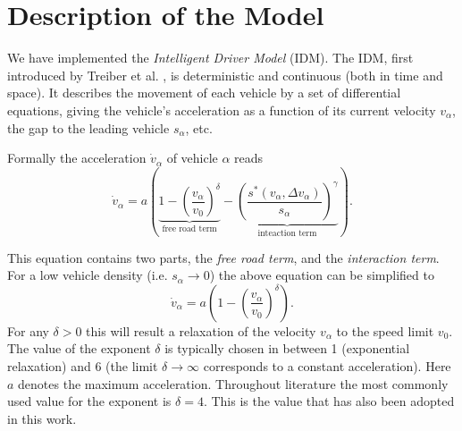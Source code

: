 \section{Description of the Model}
\label{sec:model}
We have implemented the \emph{Intelligent Driver Model} (IDM). The IDM, first introduced by Treiber et al. \cite{treiber1999, treiber2000}, is deterministic and continuous (both in time and space). It describes the movement of each vehicle by a set of differential equations, giving the vehicle's acceleration as a function of its current velocity $v_\alpha$, the gap to the leading vehicle $s_\alpha$, etc. 

Formally the acceleration $\dot v_\alpha$ of vehicle $\alpha$ reads 
\begin{equation}
\dot v_\alpha = a\left(\underbrace{1-\left(\frac{v_\alpha}{v_0}\right)^\delta}_{\text{free road term}} - \underbrace{\left(\frac{s^*(v_\alpha, \Delta v_\alpha)}{s_\alpha}\right)^\gamma}_{\text{inteaction term}}\right).
\label{eq:IDM}
\end{equation}


This equation contains two parts, the \emph{free road term}, and the \emph{interaction term}. For a low vehicle density (i.e. $s_\alpha \rightarrow 0$) the above equation can be simplified to
\begin{equation}
\dot v_\alpha = a\left(1-\left(\frac{v_\alpha}{v_0}\right)^\delta\right).
\end{equation}
For any $\delta>0$ this will result a relaxation of the velocity $v_\alpha$ to the speed limit $v_0$. The value of the exponent $\delta$ is typically chosen in between 1 (exponential relaxation) and 6 (the limit $\delta\rightarrow \infty$ corresponds to a constant acceleration). Here $a$ denotes the maximum acceleration. Throughout literature the most commonly used value for the exponent is $\delta=4$. This is the value that has also been adopted in this work.

